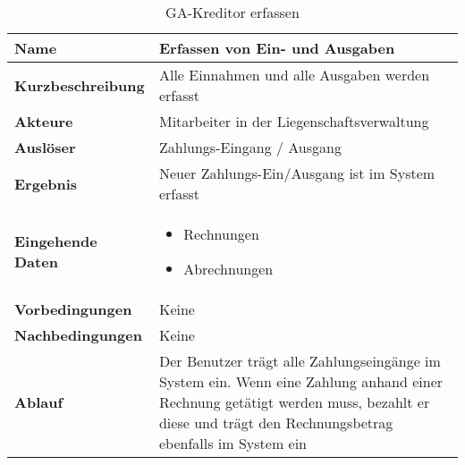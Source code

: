 \begin{table}[H]
  \centering
  \settowidth{}
  \setlength\extrarowheight{2pt}
  \begin{tabulary}{1.0\textwidth}{|a|m{12cm}|}
    \hline
    \textbf{Name}& Erfassen von Ein- und Ausgaben\\
    \hline 
    \textbf{Kurzbeschreibung} & Alle Einnahmen und alle Ausgaben werden erfasst\\
    \hline
    \textbf{Akteure} & Mitarbeiter in der Liegenschaftsverwaltung\\
    \hline
    \textbf{Auslöser} & Zahlungs-Eingang / Ausgang\\
    \hline
    \textbf{Ergebnis} & Neuer Zahlungs-Ein/Ausgang ist im System erfasst\\
    \hline
    \textbf{Eingehende Daten} &
    \begin{itemize}
      \item Rechnungen
      \item Abrechnungen
    \end{itemize} \\
    \hline
    \textbf{Vorbedingungen} & Keine\\
    \hline
    \textbf{Nachbedingungen} & Keine\\
    \hline
    \textbf{Ablauf} & Der Benutzer trägt alle Zahlungseingänge im System ein. Wenn eine Zahlung anhand einer Rechnung getätigt werden muss, bezahlt er diese und trägt den Rechnungsbetrag ebenfalls im System ein\\
    \hline
  \end{tabulary}
  \caption{GA-Kreditor erfassen}
\end{table}

